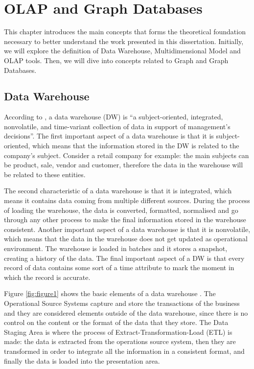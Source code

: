 \chapter{OLAP and Graph Databases}
This chapter introduces the main concepts that forms the theoretical foundation necessary to better understand the work presented in this dissertation. Initially, we will explore the definition of Data Warehouse, Multidimensional Model and OLAP tools. Then, we will dive into concepts related to Graph and Graph Databases.

\section{Data Warehouse}
According to \cite{Inmon2005}, a data warehouse (DW) is ``a subject-oriented, integrated, nonvolatile, and time-variant collection of data in support of management's decisions''. The first important aspect of a data warehouse is that it is subject-oriented, which means that the information stored in the DW is related to the company's subject. Consider a retail company for example: the main subjects can be product, sale, vendor and customer, therefore the data in the warehouse will be related to these entities.
 
The second characteristic of a data warehouse is that it is integrated, which means it contains data coming from multiple different sources. During the process of loading the warehouse, the data is converted, formatted, normalised and go through any other process to make the final information stored in the warehouse consistent. Another important aspect of a data warehouse is that it is nonvolatile, which means that the data in the warehouse does not get updated as operational environment. The warehouse is loaded in batches and it stores a snapshot, creating a history of the data. The final important aspect of a DW is that every record of data contains some sort of a time attribute to mark the moment in which the record is accurate.
 
Figure \ref{fig:figure1} shows the basic elements of a data warehouse \cite{Kimball2011}. The Operational Source Systems capture and store the transactions of the business and they are considered elements outside of the data warehouse, since there is no control on the content or the format of the data that they store. The Data Staging Area is where the process of Extract-Transformation-Load (ETL) is made: the data is extracted from the operations source system, then they are transformed in order to integrate all the information in a consistent format, and finally the data is loaded into the presentation area.

